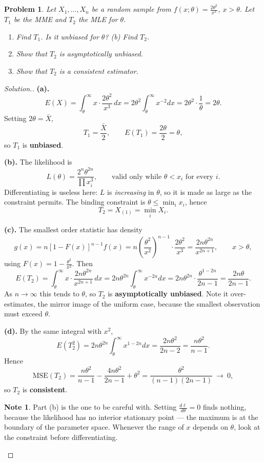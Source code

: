 \documentclass[12pt,a4paper]{report}
\theoremstyle{definition}
\newtheorem{note}[thm]{Note}
\theoremstyle{plain}
\newtheorem{problemx}{Problem}[section]
\newenvironment{problem}{\begin{problemx}}{\end{problemx}}
\newenvironment{solution}
  {\renewcommand{\qedsymbol}{}\begin{proof}[\textit{Solution}.]}
  {\end{proof}}
\begin{document}
\begin{problem}
Let $X_1,\ldots,X_n$ be a random sample from $f(x;\theta)=\frac{2\theta^2}{x^3}$,
$x>\theta$. Let $T_1$ be the MME and $T_2$ the MLE for $\theta$.
\begin{enumerate}
\item[(a).] Find $T_1$. Is it unbiased for $\theta$? \quad (b) Find $T_2$.
\item[(c).] Show that $T_2$ is asymptotically unbiased.
\item[(d).] Show that $T_2$ is a consistent estimator.
\end{enumerate}
\end{problem}

\begin{solution}
\textbf{(a).}
\[E(X)=\int_\theta^\infty x\cdot\frac{2\theta^2}{x^3}\,dx
=2\theta^2\int_\theta^\infty x^{-2}dx=2\theta^2\cdot\frac{1}{\theta}=2\theta.\]
Setting $2\theta=\bar X$,
\[T_1=\frac{\bar X}{2},\qquad E(T_1)=\frac{2\theta}{2}=\theta,\]
so $T_1$ is \textbf{unbiased}.

\textbf{(b).} The likelihood is
\[L(\theta)=\frac{2^n\theta^{2n}}{\prod x_i^3},\qquad\text{valid only while }
\theta<x_i\text{ for every }i.\]
Differentiating is useless here: $L$ is \emph{increasing} in $\theta$, so it is made
as large as the constraint permits. The binding constraint is
$\theta\leq\min_i x_i$, hence
\[T_2=X_{(1)}=\min_i X_i.\]

\textbf{(c).} The smallest order statistic has density
\[g(x)=n\left[1-F(x)\right]^{n-1}f(x)
=n\left(\frac{\theta^2}{x^2}\right)^{n-1}\cdot\frac{2\theta^2}{x^3}
=\frac{2n\theta^{2n}}{x^{2n+1}},\qquad x>\theta,\]
using $F(x)=1-\frac{\theta^2}{x^2}$. Then
\[E(T_2)=\int_\theta^\infty x\cdot\frac{2n\theta^{2n}}{x^{2n+1}}\,dx
=2n\theta^{2n}\int_\theta^\infty x^{-2n}dx
=2n\theta^{2n}\cdot\frac{\theta^{1-2n}}{2n-1}=\frac{2n\theta}{2n-1}.\]
As $n\to\infty$ this tends to $\theta$, so $T_2$ is \textbf{asymptotically
unbiased}. Note it over-estimates, the mirror image of the uniform case, because
the smallest observation must exceed $\theta$.

\textbf{(d).} By the same integral with $x^2$,
\[E\left(T_2^2\right)=2n\theta^{2n}\int_\theta^\infty x^{1-2n}dx
=\frac{2n\theta^2}{2n-2}=\frac{n\theta^2}{n-1}.\]
Hence
\[\text{MSE}(T_2)=\frac{n\theta^2}{n-1}-\frac{4n\theta^2}{2n-1}+\theta^2
=\frac{\theta^2}{(n-1)(2n-1)}\ \longrightarrow\ 0,\]
so $T_2$ is \textbf{consistent}.

\begin{note}
Part (b) is the one to be careful with. Setting $\frac{d\ell}{d\theta}=0$ finds
nothing, because the likelihood has no interior stationary point --- the maximum is
at the boundary of the parameter space. Whenever the range of $x$ depends on
$\theta$, look at the constraint before differentiating.
\end{note}
\end{solution}
\end{document}
